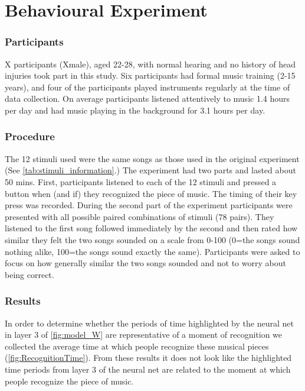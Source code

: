 \chapter*{Behavioural Experiment}
\subsection*{Participants}
X participants (Xmale), aged 22-28, with normal hearing and no history of head injuries took part in this study. Six participants had formal music training (2-15 years), and four of the participants played instruments regularly at the time of data collection. On average participants listened attentively to music 1.4 hours per day and had music playing in the background for 3.1 hours per day. 
\subsection*{Procedure}
The 12 stimuli used were the same songs as those used in the original experiment (See \autoref{tab:stimuli_information}.)
The experiment had two parts and lasted about 50 mins.
First, participants listened to each of the 12 stimuli and pressed a button when (and if) they recognized the piece of music.
The timing of their key press was recorded. 
During the second part of the experiment participants were presented with all possible paired combinations of stimuli (78 pairs). 
They listened to the first song followed immediately by the second and then rated how similar they felt the two songs sounded on a scale from 0-100 (0=the songs sound nothing alike, 100=the songs sound exactly the same).
Participants were asked to focus on how generally similar the two songs sounded and not to worry about being correct.

\subsection*{Results}
In order to determine whether the periods of time highlighted by the neural net in layer 3 of \autoref{fig:model_W} are representative of a moment of recognition we collected the average time at which people recognize these musical pieces (\autoref{fig:RecognitionTime}). 
From these results it does not look like the highlighted time periods from layer 3 of the neural net are related to the moment at which people recognize the piece of music. 

